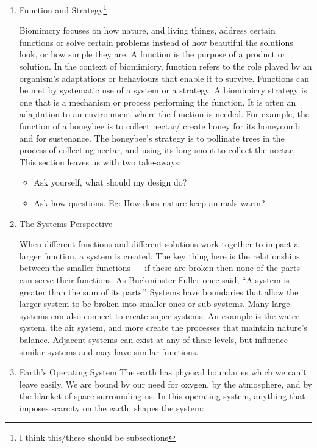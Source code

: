 \begin{enumerate}
  \item Function and Strategy\footnote{I think this/these should be subsections}
  

Biomimcry focuses on how nature, and living things, address certain functions or solve certain problems instead of how beautiful the solutions look, or how simple they are. A function is the purpose of a product or solution. In the context of biomimicry, function refers to the role played by an organism's adaptations or behaviours that enable it to survive. Functions can be met by systematic use of a system or a strategy. A biomimicry strategy is one that is a mechanism or process performing the function. It is often an adaptation to an environment where the function is needed. For example, the function of a honeybee is to collect nectar/ create honey for its honeycomb and for sustenance. The honeybee's strategy is to pollinate trees in the process of collecting nectar, and using its long snout to collect the nectar.
This section leaves us with two take-aways:
  \begin{itemize}
\item Ask yourself, what should my design do? 
\item Ask how questions. Eg: How does nature keep animals warm?
  \end{itemize}



  \item The Systems Perspective
	
When different functions and different solutions work together to impact a larger function, a system is created. The key thing here is the relationships between the smaller functions --- if these are broken then none of the parts can serve their functions. As Buckminster Fuller once said, ``A system is greater than the sum of its parts.'' Systems have boundaries that allow the larger system to be broken into smaller ones or sub-systems. Many large systems can also connect to create super-systems. An example is the water system, the air system, and more create the processes that maintain nature's balance. Adjacent systems can exist at any of these levels, but influence similar systems and may have similar functions.

\item Earth's Operating System
The earth has physical boundaries which we can't leave easily. We are bound by our need for oxygen, by the atmosphere, and by the blanket of space surrounding us.
In this operating system, anything that imposes scarcity on the earth, shapes the system:


\end{enumerate}
